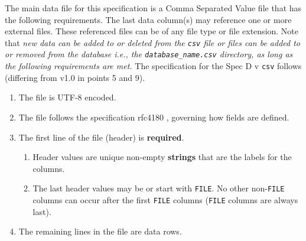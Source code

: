The main data file for this specification is a Comma Separated Value file that
has the following requirements.  The last data column(s) may reference one or
more external files. These referenced files can be of any file type or file
extension.  Note that \textit{new data can be added to or deleted from the
\texttt{\small csv} file or files can be added to or removed from the database
i.e., the \texttt{\small database\_name.csv} directory, as long as the 
following requirements are met.} The specification for the Spec D v\version
\texttt{\small csv} follows (differing from v1.0 in points 5 and 9).

\begin{enumerate}
\item The file is UTF-8 encoded.
\item The file follows the specification rfc4180 \cite{rfc4180}, governing how
      fields are defined.
\item The first line of the file (header) is \textbf{required}. 
\begin{enumerate}
    \item Header values are unique non-empty \textbf{strings} that are the 
          labels for the columns.
    \item The last header values may be or start with \texttt{\small FILE}. No 
          other non-\texttt{\small FILE} columns can occur after the first
          \texttt{\small FILE} columns (\texttt{\small FILE} columns are 
          always last). 
\end{enumerate}

\item The remaining lines in the file are data rows.


\end{enumerate}

